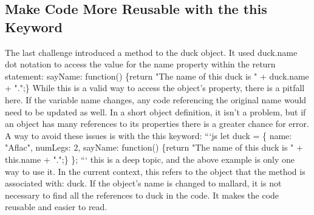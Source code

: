 \documentclass{article}%
\begin{document}
\subsection{Make Code More Reusable with the this Keyword}%
\label{subsec:MakeCodeMoreReusablewiththethisKeyword}%
The last challenge introduced a method to the duck object. It used duck.name dot notation to access the value for the name property within the return statement:\newline%
sayName: function() \{return "The name of this duck is " + duck.name + ".";\}\newline%
While this is a valid way to access the object's property, there is a pitfall here. If the variable name changes, any code referencing the original name would need to be updated as well. In a short object definition, it isn't a problem, but if an object has many references to its properties there is a greater chance for error.\newline%
A way to avoid these issues is with the this keyword:\newline%
```js\newline%
let duck = \{\newline%
  name: "Aflac",\newline%
  numLegs: 2,\newline%
  sayName: function() \{return "The name of this duck is " + this.name + ".";\}\newline%
\};\newline%
```\newline%
this is a deep topic, and the above example is only one way to use it. In the current context, this refers to the object that the method is associated with: duck.\newline%
If the object's name is changed to mallard, it is not necessary to find all the references to duck in the code. It makes the code reusable and easier to read.\newline%

%
\end{document}
